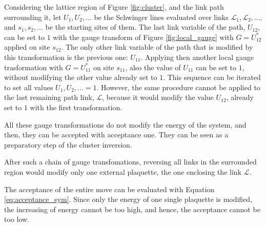 Considering the lattice region of Figure \ref{fig:cluster}, and the link path surrounding it,
let $U_1, U_2, \ldots$ be the Schwinger lines evaluated over links $\mathcal L_1, \mathcal L_2, \ldots$,
and $s_1, s_2, \ldots$ be the starting sites of them.
The last link variable of the path, $U_{12}$, can be set to $1$ with the gauge transform of Figure \ref{fig:local_gauge}
with $G=U^*_{12}$ applied on site $s_{12}$.
The only other link variable of the path that is modified by this transformation is the previous one: $U_{11}$.
Applying then another local gauge trasformation with $G=U^*_{11}$ on site $s_{11}$,
also the value of $U_{11}$ can be set to $1$, without modifying the other value already set to $1$.
This sequence can be iterated to set all values $U_1,U_2,\ldots=1$.
However, the same procedure cannot be applied to the last remaining path link, $\mathcal L$,
because it would modify the value $U_{12}$, already set to $1$ with the first transformation.

All these gauge transformations do not modify the energy of the system,
and then, they can be accepted with acceptance one.
They can be seen as a preparatory step of the cluster inversion.

After such a chain of gauge transfomations,
reversing all links in the surrounded region would modify only one external plaquette,
the one enclosing the link $\mathcal L$.

The acceptance of the entire move can be evaluated with Equation \eqref{eq:acceptance_sym}.
Since only the energy of one single plaquette is modified,
the increasing of energy cannot be too high, and hence, the acceptance cannot be too low.

